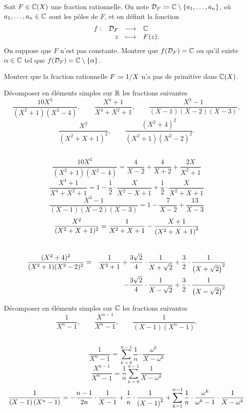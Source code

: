 \documentclass{magnolia}
\begin{document}

Soit $F\in\fracC$ une fraction rationnelle. On note $\mathcal{D}_F\coloneqq\mathbb{C}\setminus\left\{a_1,\ldots,a_n\right\}$,
où $a_1,\ldots,a_n\in\mathbb{C}$ sont les pôles de $F$, et on définit la fonction
\[\begin{array}[t]{lrcl} \displaystyle{f} : & \displaystyle{\mathcal{D}_F} & \longrightarrow & \displaystyle{\mathbb{C}} \\ & \displaystyle{z} & \longmapsto & \displaystyle{F(z).} \end{array}\]
On suppose que $F$ n'est pas constante. Montrer que $f(\mathcal{D}_F)=\mathbb{C}$ ou qu'il existe $\alpha\in\mathbb{C}$
tel que $f(\mathcal{D}_F)=\mathbb{C}\setminus\left\{\alpha\right\}$.

Montrer que la fraction rationnelle $F\coloneqq 1/X$ n'a pas de primitive dans $\fracC$.



Décomposer en éléments simples sur $\mathbb{R}$ les fractions suivantes
\[\frac{10X^3}{(X^2+1)(X^2-4)}, \qquad \frac{X^4+1}{X^4+X^2+1},
  \qquad \frac{X^3-1}{(X-1)(X-2)(X-3)},\]
\[\frac{X^2}{(X^2+X+1)^2}, \qquad \frac{(X^2+4)^2}{(X^2+1)(X^2-2)^2}.\]
\begin{sol}
$\quad$
\begin{questions}
\question 
  \[\frac{10X^3}{(X^2+1)(X^2-4)}=
    \frac{4}{X-2}+\frac{4}{X+2}+\frac{2X}{X^2+1}\]
\question 
  \[\frac{X^4+1}{X^4+X^2+1}=
    1-\frac{1}{2}\cdot\frac{X}{X^2-X+1}+\frac{1}{2}\cdot\frac{X}{X^2+X+1}\]
\question 
  \[\frac{X^3-1}{(X-1)(X-2)(X-3)}=
    1-\frac{7}{X-2}+\frac{13}{X-3}\]
\question 
  \[\frac{X^2}{(X^2+X+1)^2}=
    \frac{1}{X^2+X+1}-\frac{X+1}{\left(X^2+X+1\right)^2}\]\
\question 
  \begin{eqnarray*}
  \frac{(X^2+4)^2}{(X^2+1)(X^2-2)^2}&=&
    \frac{1}{X^2+1}+\frac{3\sqrt{2}}{4}\cdot\frac{1}{X+\sqrt{2}}
    +\frac{3}{2}\cdot\frac{1}{\left(X+\sqrt{2}\right)^2}\\
   & &
    -\frac{3\sqrt{2}}{4}\cdot\frac{1}{X-\sqrt{2}}
    +\frac{3}{2}\cdot\frac{1}{\left(X-\sqrt{2}\right)^2}
  \end{eqnarray*}
\end{questions}
\end{sol}

Décomposer en éléments simples sur $\mathbb{C}$ les fractions suivantes
\[\frac{1}{X^n-1}, \qquad \frac{X^{n-1}}{X^n-1}, \qquad
  \frac{1}{(X-1)(X^n-1)}.\]
\begin{sol}
$\quad$
\begin{questions}
\question 
  \[\frac{1}{X^n-1}=\sum_{k=0}^{n-1} \frac{1}{n}\cdot\frac{\omega^k}{X-\omega^k}\]
\question 
  \[\frac{X^{n-1}}{X^n-1}=\frac{1}{n}\sum_{k=0}^{n-1} \frac{1}{X-\omega^k}\]
\question 
  \[\frac{1}{\left(X-1\right)\left(X^n-1\right)}=-\frac{n-1}{2n}\cdot\frac{1}{X-1}+
    \frac{1}{n}\cdot\frac{1}{\left(X-1\right)^2}+\sum_{k=1}^{n-1}
    \frac{1}{n}\cdot\frac{\omega^k}{\omega^k-1}\cdot\frac{1}{X-\omega^k}\]
\end{questions}
\end{sol}
\end{document}
